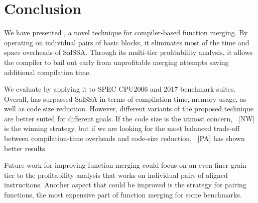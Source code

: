 \section{Conclusion}


We have presented \ProjName, a novel technique for compiler-based function merging. By operating on individual pairs of basic blocks, it eliminates most of the time and space overheads of SalSSA. Through its multi-tier profitability analysis, it allows the compiler to bail out early from unprofitable merging attempts saving additional compilation time.

We evaluate \ProjName by applying it to SPEC CPU2006 and 2017 benchmark suites.
Overall, \ProjName has surpassed SalSSA in terms of compilation time, memory usage, as well as code size reduction.
However, different variants of the proposed technique are better suited for different goals.
If the code size is the utmost concern, {\ProjName}~[NW] is the winning strategy, but if we are looking for the most balanced trade-off between compilation-time overheads and code-size reduction, {\ProjName}~[PA] has shown better results.



Future work for improving function merging could focus on an even finer grain tier to the profitability analysis that works on individual pairs of aligned instructions. Another aspect that could be improved is the strategy for pairing functions, the most expensive part of function merging for some benchmarks.